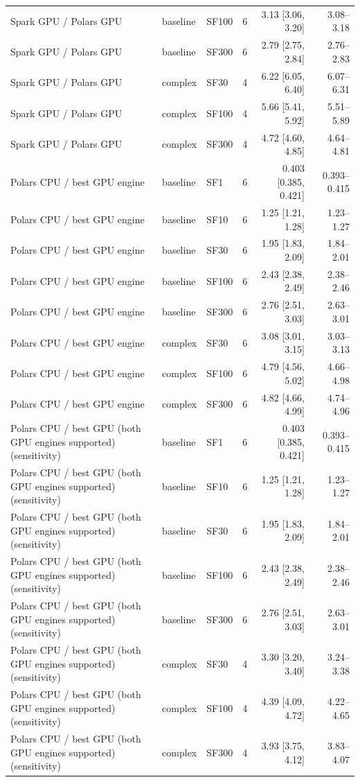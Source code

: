 \begin{tabular}{lllrrr}
Spark GPU / Polars GPU & baseline & SF100 & 6 & 3.13 [3.06, 3.20] & 3.08--3.18 \\
Spark GPU / Polars GPU & baseline & SF300 & 6 & 2.79 [2.75, 2.84] & 2.76--2.83 \\
Spark GPU / Polars GPU & complex & SF30 & 4 & 6.22 [6.05, 6.40] & 6.07--6.31 \\
Spark GPU / Polars GPU & complex & SF100 & 4 & 5.66 [5.41, 5.92] & 5.51--5.89 \\
Spark GPU / Polars GPU & complex & SF300 & 4 & 4.72 [4.60, 4.85] & 4.64--4.81 \\
Polars CPU / best GPU engine & baseline & SF1 & 6 & 0.403 [0.385, 0.421] & 0.393--0.415 \\
Polars CPU / best GPU engine & baseline & SF10 & 6 & 1.25 [1.21, 1.28] & 1.23--1.27 \\
Polars CPU / best GPU engine & baseline & SF30 & 6 & 1.95 [1.83, 2.09] & 1.84--2.01 \\
Polars CPU / best GPU engine & baseline & SF100 & 6 & 2.43 [2.38, 2.49] & 2.38--2.46 \\
Polars CPU / best GPU engine & baseline & SF300 & 6 & 2.76 [2.51, 3.03] & 2.63--3.01 \\
Polars CPU / best GPU engine & complex & SF30 & 6 & 3.08 [3.01, 3.15] & 3.03--3.13 \\
Polars CPU / best GPU engine & complex & SF100 & 6 & 4.79 [4.56, 5.02] & 4.66--4.98 \\
Polars CPU / best GPU engine & complex & SF300 & 6 & 4.82 [4.66, 4.99] & 4.74--4.96 \\
Polars CPU / best GPU (both GPU engines supported) (sensitivity) & baseline & SF1 & 6 & 0.403 [0.385, 0.421] & 0.393--0.415 \\
Polars CPU / best GPU (both GPU engines supported) (sensitivity) & baseline & SF10 & 6 & 1.25 [1.21, 1.28] & 1.23--1.27 \\
Polars CPU / best GPU (both GPU engines supported) (sensitivity) & baseline & SF30 & 6 & 1.95 [1.83, 2.09] & 1.84--2.01 \\
Polars CPU / best GPU (both GPU engines supported) (sensitivity) & baseline & SF100 & 6 & 2.43 [2.38, 2.49] & 2.38--2.46 \\
Polars CPU / best GPU (both GPU engines supported) (sensitivity) & baseline & SF300 & 6 & 2.76 [2.51, 3.03] & 2.63--3.01 \\
Polars CPU / best GPU (both GPU engines supported) (sensitivity) & complex & SF30 & 4 & 3.30 [3.20, 3.40] & 3.24--3.38 \\
Polars CPU / best GPU (both GPU engines supported) (sensitivity) & complex & SF100 & 4 & 4.39 [4.09, 4.72] & 4.22--4.65 \\
Polars CPU / best GPU (both GPU engines supported) (sensitivity) & complex & SF300 & 4 & 3.93 [3.75, 4.12] & 3.83--4.07 \\
\bottomrule
\end{tabular}
